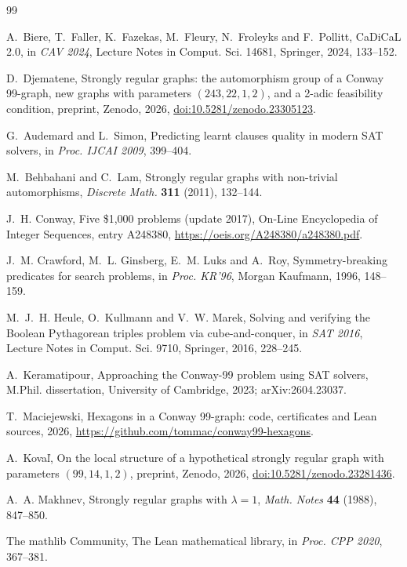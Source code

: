 \documentclass[11pt]{amsart}
\theoremstyle{remark}
\begin{document}
\begin{thebibliography}{99}

A.~Biere, T.~Faller, K.~Fazekas, M.~Fleury, N.~Froleyks and F.~Pollitt,
CaDiCaL 2.0, in \emph{CAV 2024}, Lecture Notes in Comput. Sci. 14681,
Springer, 2024, 133--152.

D.~Djematene, Strongly regular graphs: the automorphism group of a Conway
99-graph, new graphs with parameters $(243,22,1,2)$, and a 2-adic feasibility
condition, preprint, Zenodo, 2026,
\href{https://doi.org/10.5281/zenodo.23305123}{doi:10.5281/zenodo.23305123}.

G.~Audemard and L.~Simon, Predicting learnt clauses quality in modern SAT
solvers, in \emph{Proc. IJCAI 2009}, 399--404.

M.~Behbahani and C.~Lam, Strongly regular graphs with non-trivial
automorphisms, \emph{Discrete Math.} \textbf{311} (2011), 132--144.

J.~H. Conway, Five \$1,000 problems (update 2017), On-Line Encyclopedia of
Integer Sequences, entry A248380,
\url{https://oeis.org/A248380/a248380.pdf}.

J.~M. Crawford, M.~L. Ginsberg, E.~M. Luks and A.~Roy, Symmetry-breaking
predicates for search problems, in \emph{Proc. KR'96}, Morgan Kaufmann, 1996,
148--159.

M.~J.~H. Heule, O.~Kullmann and V.~W. Marek, Solving and verifying the Boolean
Pythagorean triples problem via cube-and-conquer, in \emph{SAT 2016}, Lecture
Notes in Comput. Sci. 9710, Springer, 2016, 228--245.

A.~Keramatipour, Approaching the Conway-99 problem using SAT solvers, M.Phil.
dissertation, University of Cambridge, 2023; arXiv:2604.23037.

T.~Maciejewski, Hexagons in a Conway 99-graph: code, certificates and Lean
sources, 2026, \url{https://github.com/tommac/conway99-hexagons}.

A.~Kova\v{l}, On the local structure of a hypothetical strongly regular graph
with parameters $(99,14,1,2)$, preprint, Zenodo, 2026,
\href{https://doi.org/10.5281/zenodo.23281436}{doi:10.5281/zenodo.23281436}.

A.~A. Makhnev, Strongly regular graphs with $\lambda=1$, \emph{Math. Notes}
\textbf{44} (1988), 847--850.

The mathlib Community, The Lean mathematical library, in \emph{Proc. CPP
2020}, 367--381.


\end{thebibliography}
\end{document}
